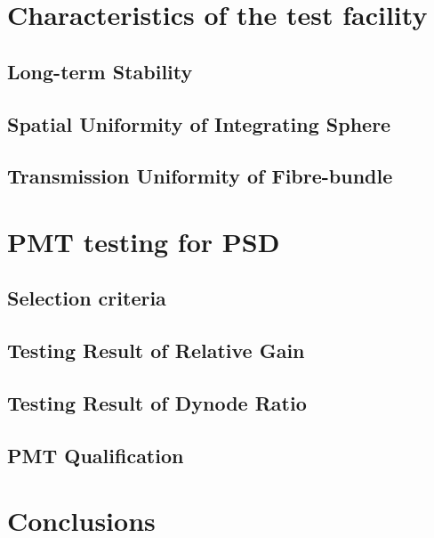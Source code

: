 \documentclass[preprint,5p,times]{elsarticle}
\begin{document}
\section{Characteristics of the test facility}
\label{sec:char_testfacility}

\subsection{Long-term Stability}
\label{sec:longterm_stability}

\subsection{Spatial Uniformity of Integrating Sphere}
\label{sec:spatialuniformity_insph}

\subsection{Transmission Uniformity of Fibre-bundle}
\label{sec:transuniformity_fibre}

\section{PMT testing for PSD}
\label{sec:pmt_test}

\subsection{Selection criteria}
\label{sec:selection}

\subsection{Testing Result of Relative Gain}
\label{sec:relative_gain}

\subsection{Testing Result of Dynode Ratio}
\label{sec:dynode_ratio}

\subsection{PMT Qualification}
\label{sec:qualification}

\section{Conclusions}
\label{sec:conclustions}
\end{document}
